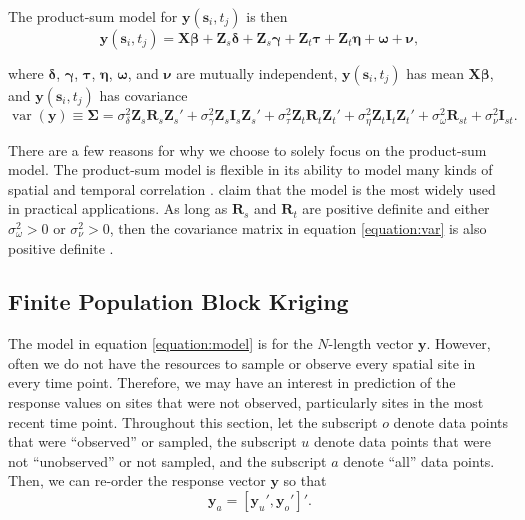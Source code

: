 \documentclass[]{interact}
\theoremstyle{plain}%
\theoremstyle{definition}
\theoremstyle{remark}
\begin{document}
The product-sum model for \(\mathbf{y}(\mathbf{s}_{i}, t_j)\) is then
\mbox{} \begin{equation} \label{equation:model}
\mathbf{y}(\mathbf{s}_{i}, t_j) = \mathbf{X} \bm{\beta} + \mathbf{Z}_{s} \bm{\delta} + \mathbf{Z}_{s} \bm{\gamma} + \mathbf{Z}_t \bm{\tau} + \mathbf{Z}_t \bm{\eta} + \bm{\omega} + \bm{\nu},
\end{equation}

\noindent where \(\bm{\delta}\), \(\bm{\gamma}\), \(\bm{\tau}\),
\(\bm{\eta}\), \(\bm{\omega}\), and \(\bm{\nu}\) are mutually
independent, \(\mathbf{y}(\mathbf{s}_{i}, t_j)\) has mean
\(\mathbf{X} \bm{\beta}\), and \(\mathbf{y}(\mathbf{s}_{i}, t_j)\) has
covariance \mbox{} \begin{equation}
\label{equation:var}
\mathop{\mathrm{{var}}}(\mathbf{y}) \equiv \bm{\Sigma} = \sigma^2_{\delta} \mathbf{Z}_{s} \mathbf{R}_{s} \mathbf{Z}_{s}' + \sigma^2_{\gamma} \mathbf{Z}_{s} \mathbf{I}_{s} \mathbf{Z}_{s}' + \sigma^2_{\tau} \mathbf{Z}_t \mathbf{R}_t \mathbf{Z}_t'+ \sigma^2_{\eta} \mathbf{Z}_t \mathbf{I}_t \mathbf{Z}_t' + \sigma^2_{\omega} \mathbf{R}_{st} + \sigma^2_{\nu} \mathbf{I}_{st}.
\end{equation}

\noindent There are a few reasons for why we choose to solely focus on
the product-sum model. The product-sum model is flexible in its ability
to model many kinds of spatial and temporal correlation
\citep{de2015spatio}. \citet{xu2015spatio} claim that the model is the
most widely used in practical applications. As long as \(\mathbf{R}_s\)
and \(\mathbf{R}_t\) are positive definite and either
\(\sigma^2_{\omega} > 0\) or \(\sigma^2_{\nu} > 0\), then the covariance
matrix in equation \ref{equation:var} is also positive definite
\citep{de2001product, de2001space}.

\subsection{Finite Population Block Kriging} \label{subsection:fpbk}

The model in equation \ref{equation:model} is for the \(N\)-length
vector \(\mathbf{y}\). However, often we do not have the resources to
sample or observe every spatial site in every time point. Therefore, we
may have an interest in prediction of the response values on sites that
were not observed, particularly sites in the most recent time point.
Throughout this section, let the subscript \(o\) denote data points that
were ``observed'' or sampled, the subscript \(u\) denote data points
that were not ``unobserved'' or not sampled, and the subscript \(a\)
denote ``all'' data points. Then, we can re-order the response vector
\(\mathbf{y}\) so that \mbox{} \begin{equation} \label{equation:ordered}
\mathbf{y}_a = [\mathbf{y}_u', \mathbf{y}_o']'.
\end{equation}
\end{document}
